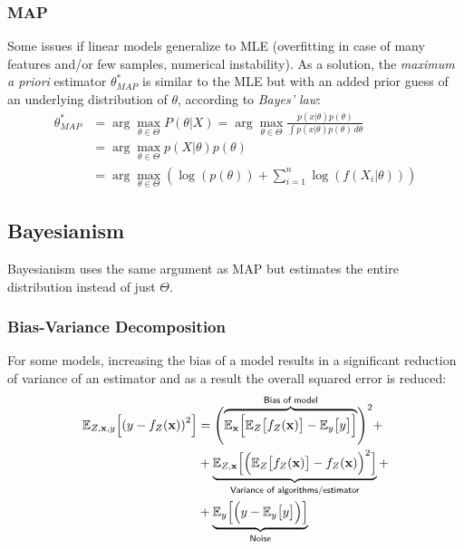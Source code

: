 \subsubsection{MAP}
Some issues if linear models generalize to MLE (overfitting in case of many features and/or few samples, numerical instability).
As a solution, the \textit{maximum a priori} estimator $\theta^*_{MAP}$ is similar to the MLE but with an added prior guess of an underlying distribution of $\theta$, according to \textit{Bayes' law}:
\noindent\begin{align*}
    \theta^*_{MAP} & = \arg\max_{\theta\in\Theta} P(\theta|X)  = \arg\max_{\theta\in\Theta} \frac{p(x|\theta)p(\theta)}{\int p(x|\theta)p(\theta)\, d\theta} \\
                   & = \arg\max_{\theta\in\Theta} p(X|\theta)p(\theta)                                                                                       \\
                   & = \arg\max_{\theta\in\Theta}\left(\log(p(\theta)) + \sum_{i=1}^{n}\log(f(X_i|\theta))\right)
\end{align*}

\subsection{Bayesianism}
Bayesianism uses the same argument as MAP but estimates the entire distribution instead of just $\Theta$.

\subsubsection{Bias-Variance Decomposition}
For some models, increasing the bias of a model results in a significant reduction of variance of an estimator and as a result the overall squared error is reduced:
\noindent\begin{align*}
    \mathbb{E}_{Z,\mathbf{x},y}\Bigl[{(y-f_Z(\mathbf{x}))}^2\Bigr] & = \Biggl(\overbrace{\mathbb{E}_{\mathbf{x}}\Bigl[\mathbb{E}_{Z}\bigl[f_Z(\mathbf{x})\bigr]-\mathbb{E}_{y}\bigl[y\bigr]\Bigr]}^{\textsf{Bias of model}}\Biggr)^2 + \\%
                                                                   & +\underbrace{\mathbb{E}_{Z,\mathbf{x}}\Bigl[{\Bigl(\mathbb{E}_{Z}\bigl[f_Z(\mathbf{x})\bigr]-f_Z(\mathbf{x})\Bigr)}^2\Bigr]}_{\textsf{Variance of algorithms/estimator}}+    \\
                                                                   & +\underbrace{\mathbb{E}_{y}\Bigl[{\Bigl(y-\mathbb{E}_{y}\bigl[y\bigr]\Bigr)}\Bigr]}_{\textsf{Noise}}
\end{align*}

